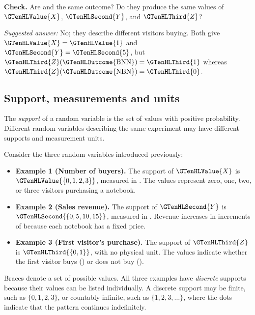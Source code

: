 \textbf{Check.} Are  and  the same outcome? Do they produce the same values of $\GTenHLValue{X}$, $\GTenHLSecond{Y}$, and $\GTenHLThird{Z}$?

\emph{Suggested answer:} No; they describe different visitors buying. Both give $\GTenHLValue{X}=\GTenHLValue{1}$ and $\GTenHLSecond{Y}=\GTenHLSecond{5}$, but $\GTenHLThird{Z}(\GTenHLOutcome{\mathrm{BNN}})=\GTenHLThird{1}$ whereas $\GTenHLThird{Z}(\GTenHLOutcome{\mathrm{NBN}})=\GTenHLThird{0}$.




\subsection{Support, measurements and units}
\label{subsec:t2-c1-support-measurements-and-units}

The \emph{support} of a random variable is the set of values with positive probability. Different random variables describing the same experiment may have different supports and measurement units.

Consider the three random variables introduced previously:

\begin{itemize}
	\item \textbf{Example 1 (Number of buyers).}
	The support of $\GTenHLValue{X}$ is $\GTenHLValue{\{0,1,2,3\}}$, measured in .
	The values represent zero, one, two, or three visitors
	purchasing a notebook.
	
	\item \textbf{Example 2 (Sales revenue).}
	The support of $\GTenHLSecond{Y}$ is $\GTenHLSecond{\{0,5,10,15\}}$, measured in .
	Revenue increases in increments of  because each
	notebook has a fixed price.
	
	\item \textbf{Example 3 (First visitor's purchase).}
	The support of $\GTenHLThird{Z}$ is $\GTenHLThird{\{0,1\}}$, with no physical unit.
	The values indicate whether the first visitor buys ()
	or does not buy ().
\end{itemize}

Braces denote a set of possible values. All three examples have \emph{discrete} supports because their values can be listed individually. A discrete support may be finite, such as $\{0,1,2,3\}$, or countably infinite, such as $\{1,2,3,\ldots\}$, where the dots indicate that the pattern continues indefinitely.

